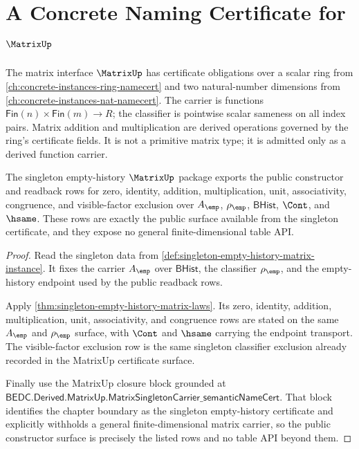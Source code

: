 \chapter{A Concrete Naming Certificate for \(\MatrixUp\)}
\label{ch:concrete-instances-matrix-namecert}

The matrix interface \(\MatrixUp\) has certificate obligations over a scalar ring from \autoref{ch:concrete-instances-ring-namecert} and two natural-number dimensions from \autoref{ch:concrete-instances-nat-namecert}. The carrier is functions \(\mathsf{Fin}(n) \times \mathsf{Fin}(m) \to R\); the classifier is pointwise scalar sameness on all index pairs. Matrix addition and multiplication are derived operations governed by the ring's certificate fields. It is not a primitive matrix type; it is admitted only as a derived function carrier.








\begin{theorem}
\label{thm:matrix-singleton-empty-public-constructor-surface}
The singleton empty-history $\MatrixUp$ package exports the public constructor
and readback rows for zero, identity, addition, multiplication, unit,
associativity, congruence, and visible-factor exclusion over $A_{\emp}$,
$\rho_{\emp}$, $\mathsf{BHist}$, $\Cont$, and $\hsame$. These rows are exactly
the public surface available from the singleton certificate, and they expose no
general finite-dimensional table API.
\end{theorem}
\begin{proof}
Read the singleton data from
\autoref{def:singleton-empty-history-matrix-instance}. It fixes the carrier
$A_{\emp}$ over $\mathsf{BHist}$, the classifier $\rho_{\emp}$, and the
empty-history endpoint used by the public readback rows.

Apply \autoref{thm:singleton-empty-history-matrix-laws}. Its zero, identity,
addition, multiplication, unit, associativity, and congruence rows are stated on
the same $A_{\emp}$ and $\rho_{\emp}$ surface, with $\Cont$ and $\hsame$ carrying
the endpoint transport. The visible-factor exclusion row is the same singleton
classifier exclusion already recorded in the MatrixUp certificate surface.

Finally use the MatrixUp closure block grounded at
$\mathsf{BEDC.Derived.MatrixUp.MatrixSingletonCarrier\_semanticNameCert}$. That
block identifies the chapter boundary as the singleton empty-history certificate
and explicitly withholds a general finite-dimensional matrix carrier, so the
public constructor surface is precisely the listed rows and no table API beyond
them.
\end{proof}

